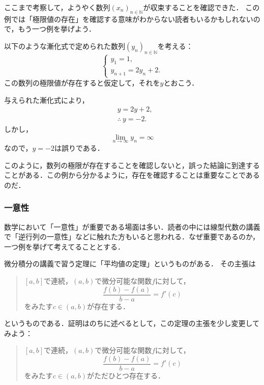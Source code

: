 \documentclass[a4paper,11pt]{ltjsarticle}
\newenvironment{tleftbar}{\begin{tbleftline}\setlength{\parindent}{1\zw}}{\end{tbleftline}}
\begin{document}
ここまで考察して，ようやく数列$(x_n)_{n \in \mathbb{N}}$が収束することを確認できた．
この例では「極限値の存在」を確認する意味がわからない読者もいるかもしれないので，もう一つ例を挙げよう．


以下のような漸化式で定められた数列$(y_n)_{n \in \mathbb{N}}$を考える：
\[
\begin{cases}
y_1 =1 ,\\
y_{n+1}= 2y_n +2.
\end{cases}
\]
この数列の極限値が存在すると仮定して，それを$y$とおこう．
\begin{tleftbar}
与えられた漸化式により，
\begin{align*} 
  & y = 2y +2, \\
  & \therefore ~ y = -2.
\end{align*}
しかし，
\[
\lim_{n \to \infty} y_n = \infty
\]
なので，$y=-2$は誤りである．
\end{tleftbar}

このように，数列の極限が存在することを確認しないと，誤った結論に到達することがある．この例から分かるように，存在を確認することは重要なことであるのだ．


\subsubsection{一意性}

数学において「一意性」が重要である場面は多い．読者の中には線型代数の講義で「逆行列の一意性」などに触れた方もいると思われる．なぜ重要であるのか，一つ例を挙げて考えてることとする．

微分積分の講義で習う定理に「平均値の定理」というものがある．
その主張は
\begin{quotation}
	$[a,b]$で連続，$(a,b)$で微分可能な関数$f$に対して，
	\[
	\frac{f(b)-f(a)}{b-a}=f'(c)
	\]
	をみたす$ c \in (a,b)$が存在する．
\end{quotation}

というものである．証明はのちに述べるとして，この定理の主張を少し変更してみよう：

\begin{quotation}
	$[a,b]$で連続，$(a,b)$で微分可能な関数$f$に対して，
	\[
	\frac{f(b)-f(a)}{b-a}=f'(c)
	\]
	をみたす$ c \in (a,b)$がただひとつ存在する．
\end{quotation}
\end{document}
